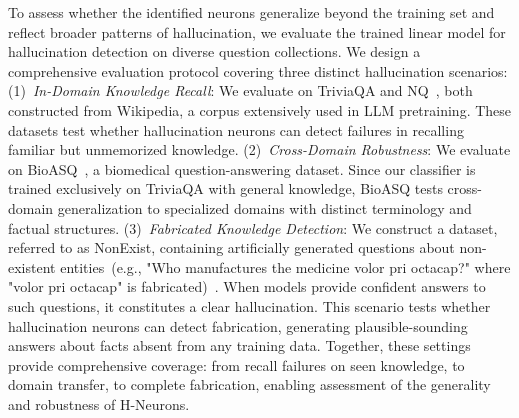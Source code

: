 \documentclass[dvipsnames]{article}
\begin{document}
To assess whether the identified neurons generalize beyond the training set and reflect broader patterns of hallucination, we evaluate the trained linear model for hallucination detection on diverse question collections.
We design a comprehensive evaluation protocol covering three distinct hallucination scenarios:
(1)~\textit{In-Domain Knowledge Recall}: We evaluate on TriviaQA and NQ~\citep{nq}, both constructed from Wikipedia, a corpus extensively used in LLM pretraining. These datasets test whether hallucination neurons can detect failures in recalling familiar but unmemorized knowledge.
(2)~\textit{Cross-Domain Robustness}: We evaluate on BioASQ~\citep{bioasq}, a biomedical question-answering dataset. Since our classifier is trained exclusively on TriviaQA with general knowledge, BioASQ tests cross-domain generalization to specialized domains with distinct terminology and factual structures.
(3)~\textit{Fabricated Knowledge Detection}: We construct a dataset, referred to as NonExist, containing artificially generated questions about non-existent entities~(e.g., "Who manufactures the medicine volor pri octacap?" where "volor pri octacap" is fabricated)~\citep{hallulens}. When models provide confident answers to such questions, it constitutes a clear hallucination. This scenario tests whether hallucination neurons can detect fabrication, generating plausible-sounding answers about facts absent from any training data.
Together, these settings provide comprehensive coverage: from recall failures on seen knowledge, to domain transfer, to complete fabrication, enabling assessment of the generality and robustness of H-Neurons.

\end{document}
